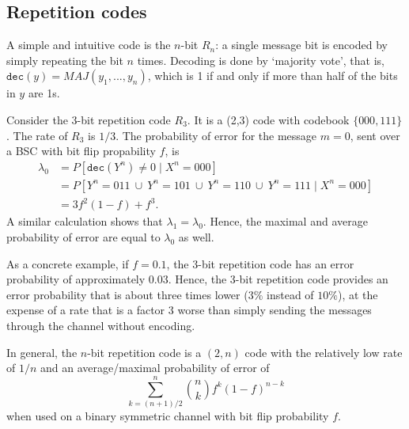 \subsection{Repetition codes}
A simple and intuitive code is the $n$-bit  $R_n$: a single message bit is encoded by simply repeating the bit $n$ times. Decoding is done by `majority vote', that is, $\mathtt{dec}(y) = MAJ(y_1, ..., y_n)$, which is 1 if and only if more than half of the bits in $y$ are 1s.

\begin{example}
Consider the 3-bit repetition code $R_3$. It is a (2,3) code with codebook $\{000,111\}$. The rate of $R_3$ is $1/3$. The probability of error for the message $m = 0$, sent over a BSC with bit flip propability $f$, is
\begin{align*}
\lambda_0 &= P[\mathtt{dec}(Y^n) \neq 0 \mid X^n = 000]\\
&= P[Y^n = 011 \ \cup \ Y^n = 101 \ \cup \ Y^n = 110 \ \cup \ Y^n = 111 \mid X^n = 000]\\
&= 3f^2(1-f) + f^3.
\end{align*}
A similar calculation shows that $\lambda_1 = \lambda_0$. Hence, the maximal and average probability of error are equal to $\lambda_0$ as well.

As a concrete example, if $f = 0.1$, the 3-bit repetition code has an error probability of approximately 0.03. Hence, the 3-bit repetition code provides an error probability that is about three times lower ($3\%$ instead of $10\%$), at the expense of a rate that is a factor 3 worse than simply sending the messages through the channel without encoding.
\end{example}
In general, the $n$-bit repetition code is a $(2,n)$ code with the relatively low rate of $1/n$ and an average/maximal probability of error of
\[
\sum_{k=(n+1)/2}^n {n \choose k} f^k (1-f)^{n-k}
\]
when used on a binary symmetric channel with bit flip probability $f$.

